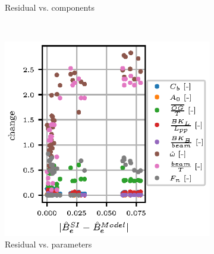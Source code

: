 \begin{figure}[H]
\begin{subfigure}[b]{0.4\textwidth}
        \caption{Residual vs. components}
        \label{fig:component_residual}
    \end{subfigure}
    \newline
    ~ %
    \begin{subfigure}[b]{0.4\textwidth}
        \centering
        \includegraphics[width=\textwidth]{figures/parameter_residual.eps}
        \caption{Residual vs. parameters}
        \label{fig:parameter_residual}
    \end{subfigure}
    ~ %
    \begin{subfigure}[b]{0.4\textwidth}
        \centering

\end{subfigure}
\end{figure}
